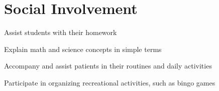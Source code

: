 \documentclass[letterpaper,10pt]{article}
\begin{document}

  \section{Social Involvement}

  \begin{resume_list}
    \item Assist students with their homework
    \item Explain math and science concepts in simple terms
  \end{resume_list}
  
\begin{resume_list}
    \item Accompany and assist patients in their routines and daily activities
    \item Participate in organizing recreational activities, such as bingo games
\end{resume_list}
\end{document}
